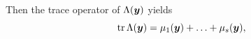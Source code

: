 Then the trace operator of $\Lambda({\boldsymbol{y}})$ yields
\begin{equation}
    \mathrm{tr} \,\Lambda({\boldsymbol{y}}) =  \mu_1({\boldsymbol{y}})+  \ldots + \mu_s({\boldsymbol{y}}),
\end{equation}




